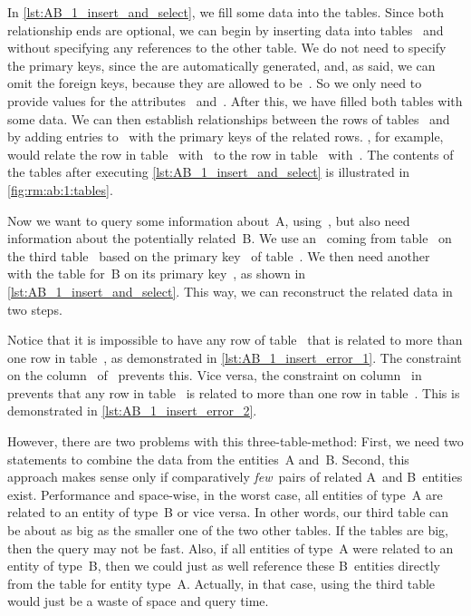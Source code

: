 In \cref{lst:AB_1_insert_and_select}, we fill some data into the tables.
Since both relationship ends are optional, we can begin by inserting data into tables~ and~ without specifying any references to the other table.
We do not need to specify the primary keys, since the are automatically generated, and, as said, we can omit the foreign keys, because they are allowed to be~.
So we only need to provide values for the attributes~ and~.
After this, we have filled both tables with some data.
We can then establish relationships between the rows of tables~ and~ by adding entries to~ with the primary keys of the related rows.
, for example, would relate the row in table~ with~ to the row in table~ with~.
The contents of the tables after executing \cref{lst:AB_1_insert_and_select} is illustrated in \cref{fig:rm:ab:1:tables}.

Now we want to query some information about~A, using~, but also need information about the potentially related~B.
We use an~ coming from table~ on the third table~ based on the primary key~ of table~.
We then need another~ with the table for~B on its primary key~, as shown in \cref{lst:AB_1_insert_and_select}.
This way, we can reconstruct the related data in two steps.

Notice that it is impossible to have any row of table~ that is related to more than one row in table~, as demonstrated in \cref{lst:AB_1_insert_error_1}.
The  constraint on the column~ of~ prevents this.
Vice versa, the  constraint on column~ in~ prevents that any row in table~ is related to more than one row in table~.
This is demonstrated in \cref{lst:AB_1_insert_error_2}.

However, there are two problems with this three-table-method:
First, we need two  statements to combine the data from the entities~A and~B.
Second, this approach makes sense only if comparatively \emph{few}~pairs of related A~and B~entities exist.
Performance and space-wise, in the worst case, all entities of type~A are related to an entity of type~B or vice versa.
In other words, our third table can be about as big as the smaller one of the two other tables.
If the tables are big, then the query may not be fast.
Also, if all entities of type~A were related to an entity of type~B, then we could just as well reference these B~entities directly from the table for entity type~A.
Actually, in that case, using the third table would just be a waste of space and query time.

